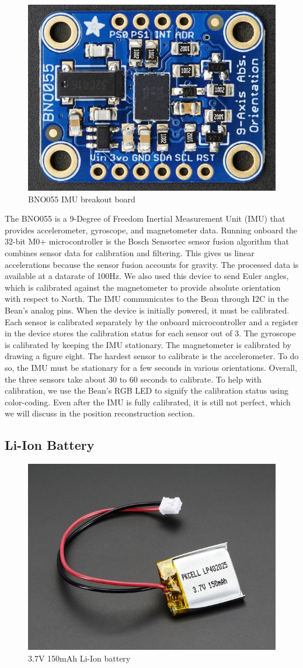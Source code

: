 \documentclass[12pt,journal]{IEEEtran}
\begin{document}
\begin{figure}[H]
  \centering
    \includegraphics[width=0.6\linewidth]{figures/imu}
  \caption{BNO055 IMU breakout board}
  \label{fig:imu}
\end{figure}
The BNO055 is a 9-Degree of Freedom Inertial Measurement Unit (IMU) that provides accelerometer, gyroscope, and magnetometer data. Running onboard the 32-bit M0+ microcontroller is the Bosch Sensortec sensor fusion algorithm that combines sensor data for calibration and filtering. This gives us linear accelerations because the sensor fusion accounts for gravity. The processed data is available at a datarate of 100Hz. We also used this device to send Euler angles, which is calibrated against the magnetometer to provide absolute orientation with respect to North. The IMU communicates to the Bean through I2C in the Bean’s analog pins.
When the device is initially powered, it must be calibrated. Each sensor is calibrated separately by the onboard microcontroller and a register in the device stores the calibration status for each sensor out of 3. The gyroscope is calibrated by keeping the IMU stationary. The magnetometer is calibrated by drawing a figure eight. The hardest sensor to calibrate is the accelerometer. To do so, the IMU must be stationary for a few seconds in various orientations. Overall, the three sensors take about 30 to 60 seconds to calibrate. To help with calibration, we use the Bean’s RGB LED to signify the calibration status using color-coding. Even after the IMU is fully calibrated, it is still not perfect, which we will discuss in the position reconstruction section.
\subsection{Li-Ion Battery}

\begin{figure}[H]
  \centering
    \includegraphics[width=0.6\linewidth]{figures/battery}
  \caption{3.7V 150mAh Li-Ion battery}
  \label{fig:battery}
\end{figure}
\end{document}
